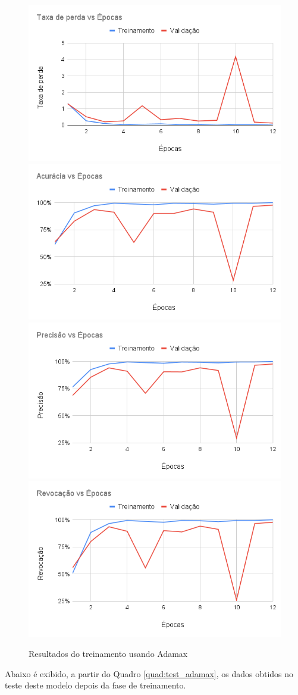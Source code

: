 \documentclass[
	12pt,				%
	oneside,			%
	a4paper,			%
	english,			%
	brazil				%
	]{abntex2ppgsi}
\begin{document}
\begin{figure}[H]
    \centering
    \caption{Resultados do treinamento usando Adamax}
    \includegraphics[width=.50\textwidth]{imagens/resultados_discussao/optimizer/adamax/perda.png}\hfill
    \includegraphics[width=.50\textwidth]{imagens/resultados_discussao/optimizer/adamax/acuracia.png}\bigbreak    \includegraphics[width=.50\textwidth]{imagens/resultados_discussao/optimizer/adamax/precisao.png}\hfill
    \includegraphics[width=.50\textwidth]{imagens/resultados_discussao/optimizer/adamax/revocacao.png}
    \label{fig:adamax_training}
\end{figure}

Abaixo é exibido, a partir do Quadro \ref{quad:test_adamax}, os dados obtidos no teste deste modelo depois da fase de treinamento.
\end{document}
